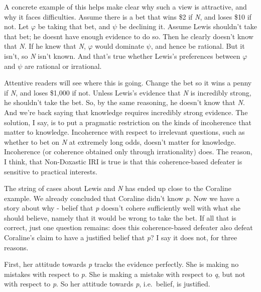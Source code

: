 \documentclass[
  10pt,
  letterpaper,
  DIV=11,
  numbers=noendperiod,
  twoside]{scrartcl}
\begin{document}
A concrete example of this helps make clear why such a view is
attractive, and why it faces difficulties. Assume there is a bet that
wins \$2 if \emph{N}, and loses \$10 if not. Let \(\varphi\) be taking
that bet, and \(\psi\) be declining it. Assume Lewis shouldn't take that
bet; he doesnt have enough evidence to do so. Then he clearly doesn't
know that \emph{N}. If he knew that \emph{N}, \(\varphi\) would dominate
\(\psi\), and hence be rational. But it isn't, so \emph{N} isn't known.
And that's true whether Lewis's preferences between \(\varphi\) and
\(\psi\) are rational or irrational.

Attentive readers will see where this is going. Change the bet so it
wins a penny if \emph{N}, and loses \$1,000 if not. Unless Lewis's
evidence that \emph{N} is incredibly strong, he shouldn't take the bet.
So, by the same reasoning, he doesn't know that \emph{N}. And we're back
saying that knowledge requires incredibly strong evidence. The solution,
I say, is to put a pragmatic restriction on the kinds of incoherence
that matter to knowledge. Incoherence with respect to irrelevant
questions, such as whether to bet on \emph{N} at extremely long odds,
doesn't matter for knowledge. Incoherence (or coherence obtained only
through irrationality) does. The reason, I think, that Non-Doxastic IRI
is true is that this coherence-based defeater is sensitive to practical
interests.

The string of cases about Lewis and \emph{N} has ended up close to the
Coraline example. We already concluded that Coraline didn't know
\emph{p}. Now we have a story about why - belief that \emph{p} doesn't
cohere sufficiently well with what she should believe, namely that it
would be wrong to take the bet. If all that is correct, just one
question remains: does this coherence-based defeater also defeat
Coraline's claim to have a justified belief that \emph{p}? I say it does
not, for three reasons.

First, her attitude towards \emph{p} tracks the evidence perfectly. She
is making no mistakes with respect to \emph{p}. She is making a mistake
with respect to \emph{q}, but not with respect to \emph{p}. So her
attitude towards \emph{p}, i.e.~belief, is justified.
\end{document}
